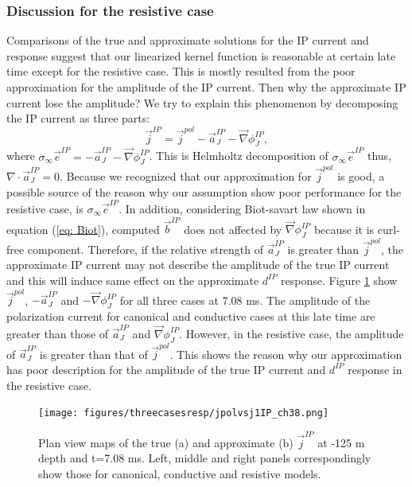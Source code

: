 \documentclass[a4paper, 11pt]{article}
\renewcommand{\div}{\nabla\cdot}
\newcommand{\grad}{\vec \nabla}
\newcommand{\siginf}{\sigma_\infty}
\renewcommand {\j}  { {\vec j} }
\renewcommand {\b}  { {\vec b} }
\newcommand {\e}  { {\vec e} }
\newcommand{\dip}{d^{IP}}
\begin{document}
\subsubsection{Discussion for the resistive case}
Comparisons of the true and approximate solutions for the IP current and response suggest that our linearized kernel function is reasonable at certain late time except for the resistive case. This is mostly resulted from the poor approximation for the amplitude of the IP current. Then why the approximate IP current lose the amplitude? We try to explain this phenomenon by decomposing the IP current as three parts:
\begin{equation}
  \j^{IP} = \j^{pol} -\vec{a}^{IP}_J-\grad \phi^{IP}_J, 
\end{equation}
where $\siginf\e^{IP} = -\vec{a}^{IP}_J - \grad \phi^{IP}_J$. This is Helmholtz decomposition of $\siginf\e^{IP}$ thus, $\div \vec{a}^{IP}_J = 0$. Because we recognized that our approximation for  $\j^{pol}$ is good, a possible source of the reason why our assumption show poor performance for the resistive case, is $\siginf \e^{IP}$. In addition, considering Biot-savart law shown in equation (\ref{eq: Biot}), computed $\b^{IP}$ does not affected by $\grad \phi^{IP}_J$ because it is curl-free component. Therefore, if the relative strength of $\vec{a}^{IP}_J$ is greater than $\j^{pol}$, the approximate IP current may not describe the amplitude of the true IP current and this will induce same effect on the approximate $\dip$ response. Figure \ref{F:jpolvsj1IP} show $\j^{pol}$, $-\vec{a}^{IP}_J$ and $-\grad \phi^{IP}_J$ for all three cases at 7.08 ms. The amplitude of the polarization current for canonical and conductive cases at this late time are greater than those of  $\vec{a}^{IP}_J$ and $\grad \phi^{IP}_J$. However, in the resistive case, the amplitude of $\vec{a}^{IP}_J$ is greater than that of $\j^{pol}$. This shows the reason why our approximation has poor description for the amplitude of the true IP current and $\dip$ response in the resistive case. 

\begin{figure}[htb]
  \centering  \texttt{[image: figures/threecasesresp/jpolvsj1IP\_ch38.png]}
  \caption{Plan view maps of the true (a) and approximate (b) $\j^{IP}$ at -125 m depth and t=7.08 ms. Left, middle and right panels correspondingly show those for canonical, conductive and resistive models.}
  \label{F:jpolvsj1IP}
\end{figure}
\clearpage
\end{document}
